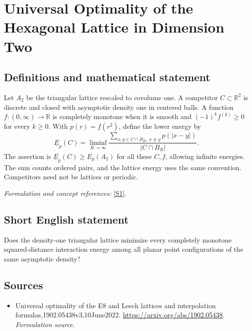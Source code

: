 \documentclass[11pt]{article}
\begin{document}
\section*{\texorpdfstring{Universal Optimality of the Hexagonal Lattice in Dimension Two}{Universal Optimality of the Hexagonal Lattice in Dimension Two}}\label{243}
\subsection{Definitions and mathematical statement}
Let $A_2$ be the triangular lattice rescaled to covolume one. A competitor $C\subset{\mathbb{R}}^2$ is discrete and closed with asymptotic density one in centered balls. A function $f:(0,\infty)\to{\mathbb{R}}$ is completely monotone when it is smooth and $(-1)^kf^{(k)}\ge0$ for every $k\ge0$. With $p(r)=f(r^2)$, define the lower energy by
\[
 \underline E_p(C)=\liminf_{R\to\infty}
 \frac{\sum_{x,y\in C\cap B_R,\ x\ne y}p(|x-y|)}{|C\cap B_R|}.
\]
The assertion is $\underline E_p(C)\ge E_p(A_2)$ for all these $C,f$, allowing infinite energies. The sum counts ordered pairs, and the lattice energy uses the same convention. Competitors need not be lattices or periodic.
\par\smallskip\textit{Formulation and concept references:} \href{https://arxiv.org/abs/1902.05438}{[S1]}.

\subsection{Short English statement}
Does the density-one triangular lattice minimize every completely monotone squared-distance interaction energy among all planar point configurations of the same asymptotic density?
\subsection{Sources}
\begin{itemize}
\item[S1]Universal optimality of the E8 and Leech lattices and interpolation formulas,1902.05438v3,10June2022.
\url{https://arxiv.org/abs/1902.05438}.
\textit{Formulation source.}
\end{itemize}
\end{document}
